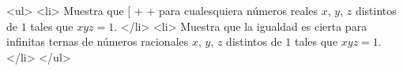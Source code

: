 <ul>
<li> Muestra que 
[ +  +  \]
para cualesquiera números reales $x$, $y$, $z$ distintos de $1$ tales que $xyz=1$. </li>
<li> Muestra que la igualdad es cierta para infinitas ternas de números racionales $x$, $y$, $z$ distintos de $1$ tales que $xyz=1$.</li>
</ul>

